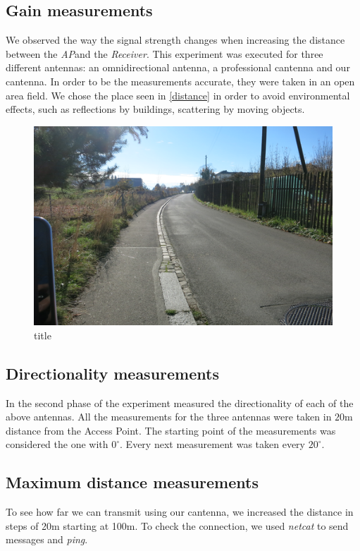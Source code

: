 \documentclass[12pt,a4paper]{article}
\newcommand{\rc}[0]{\emph{Receiver}}
\newcommand{\ap}[0]{\emph{AP}}
\begin{document}
		\subsection{Gain measurements}
			We observed the way the signal strength changes when increasing the distance between the \ap and the \rc. This experiment was executed for three different antennas: an omnidirectional antenna, a professional cantenna and our cantenna.
			In order to be the measurements accurate, they were taken in an open area field. We chose the place seen in \autoref{distance} in order to avoid environmental effects, such as reflections by buildings, scattering by moving objects.
			\begin{figure}

				\includegraphics[width=\textwidth]{images/distance.png}

				\caption{title}
				\label{distance}
			\end{figure}
		
		\subsection{Directionality measurements}
			In the second phase of the experiment measured the directionality of each of the above antennas. All the measurements for the three antennas were taken in $20$m distance from the Access Point. The starting point of the measurements was considered the one with $0^{\circ}$. Every next measurement was taken every $20^{\circ}$.

		\subsection{Maximum distance measurements}
			To see how far we can transmit using our cantenna, we increased the distance in steps of 20m starting at 100m. To check the connection, we used \emph{netcat} to send messages and \emph{ping}.
		
\end{document}
